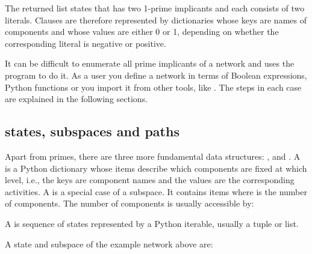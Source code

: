\documentclass[letterpaper,10pt,english]{sphinxmanual}
\begin{document}
The returned list states that  has two 1-prime implicants and each consists of two literals.
Clauses are therefore represented by dictionaries whose keys are names of components and whose values are either 0 or 1,
depending on whether the corresponding literal is negative or positive.

It can be difficult to enumerate all prime implicants of a network and  uses the program {\hyperref[\detokenize{Installation:installation-bnettoprime}]{}} to do it.
As a user you define a network in terms of Boolean expressions, Python functions or you import it from other tools, like .
The steps in each case are explained in the following sections.


\subsection{states, subspaces and paths}
\label{\detokenize{Manual:states-subspaces-paths}}\label{\detokenize{Manual:states-subspaces-and-paths}}
Apart from primes, there are three more fundamental data structures: ,  and .
A  is a Python dictionary whose items describe which components are fixed at which level, i.e., the keys are component names and the values are the corresponding activities.
A  is a special case of a subspace.
It contains  items where  is the number of components.
The number of components is usually accessible by:

\begin{sphinxVerbatim}[commandchars=\\\{\}]
  
\end{sphinxVerbatim}

A  is sequence of states represented by a Python iterable, usually a tuple or list.

A state and subspace of the example network above are:

\begin{sphinxVerbatim}[commandchars=\\\{\}]
  
  
\end{sphinxVerbatim}
\end{document}
